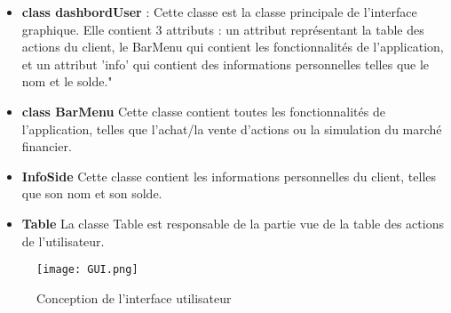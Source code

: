 \documentclass[10pt]{article}
\begin{document}
\begin{itemize}
    \item \textbf{class dashbordUser} : Cette classe est la classe principale de l'interface graphique. Elle contient 3 attributs : un attribut représentant la table des actions du client, le BarMenu qui contient les fonctionnalités de l'application, et un attribut 'info' qui contient des informations personnelles telles que le nom et le solde."

    \item \textbf{class BarMenu}
        Cette classe contient toutes les fonctionnalités de l'application, telles que l'achat/la vente d'actions ou la simulation du marché financier.

    \item \textbf{InfoSide} 
        Cette classe contient les informations personnelles du client, telles que son nom et son solde.

    \item \textbf{Table}
        La classe Table est responsable de la partie vue de la table des actions de l'utilisateur.
    
\end{itemize}


\begin{figure}
    \centering
    \texttt{[image: GUI.png]}
    \caption{Conception de l'interface utilisateur}
    \label{fig:enter-label}
\end{figure}




\end{document}
